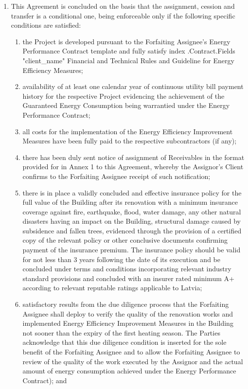 \documentclass[a4paper]{article}
\begin{document}
\begin{enumerate}
\item{This Agreement is concluded on the basis that the assignment,
    cession and transfer is a conditional one, being enforceable only
    if the following specific conditions are satisfied:}

  \begin{enumerate}
  \item{the Project is developed pursuant to the Forfaiting Assignee’s
      Energy Performance Contract template and fully satisfy {{index .Contract.Fields "client_name"}}
      Financial and Technical Rules and Guideline for Energy
      Efficiency Measures;}

  \item{availability of at least one calendar year of continuous
      utility bill payment history for the respective Project
      evidencing the achievement of the Guaranteed Energy Consumption
      being warrantied under the Energy Performance Contract;}

  \item{all costs for the implementation of the Energy Efficiency
      Improvement Measures have been fully paid to the respective
      subcontractors (if any);}

  \item{there has been duly sent notice of assignment of Receivables
      in the format provided for in Annex 1 to this Agreement, whereby
      the Assignor’s Client confirms to the Forfaiting Assignee
      receipt of such notification;}

  \item{there is in place a validly concluded and effective insurance
      policy for the full value of the Building after its renovation
      with a minimum insurance coverage against fire, earthquake,
      flood, water damage, any other natural disasters having an
      impact on the Building, structural damage caused by subsidence
      and fallen trees, evidenced through the provision of a certified
      copy of the relevant policy or other conclusive documents
      confirming payment of the insurance premium. The insurance
      policy should be valid for not less than 3 years following the
      date of its execution and be concluded under terms and
      conditions incorporating relevant industry standard provisions
      and concluded with an insurer rated minimum A+ according to
      relevant reputable ratings applicable to Latvia;}

  \item{satisfactory results from the due diligence process that the
      Forfaiting Assignee shall deploy to verify the quality of the
      renovation works and implemented Energy Efficiency Improvement
      Measures in the Building not sooner than the expiry of the first
      heating season. The Parties acknowledge that this due diligence
      condition is inserted for the sole benefit of the Forfaiting
      Assignee and to allow the Forfaiting Assignee to review of the
      quality of the work executed by the Assignor and the actual
      amount of energy consumption achieved under the Energy
      Performance Contract); and}


\end{enumerate}
\end{enumerate}
\end{document}

